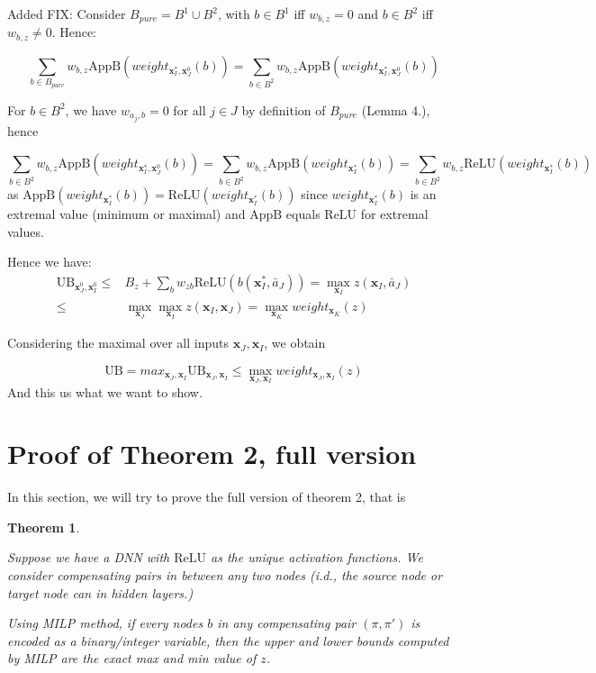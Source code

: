 \documentclass[]{article}
\newtheorem{theorem}{Theorem}
\theoremstyle{definition}
\newcommand{\ReLU}{\mathrm{ReLU}}
\begin{document}
Added FIX:
Consider $B_{pure}=B^1 \cup B^2$, with $b \in B^1$ iff
$w_{b,z} = 0$ and $b \in B^2$ iff $w_{b,z} \neq 0$.
Hence:

$$\sum_{b\in B_{pure}} w_{b,z} \mathrm{AppB}(weight_{\boldsymbol{x}^*_I,\boldsymbol{x}^0_J}(b)) = 
\sum_{b\in B^2} w_{b,z} \mathrm{AppB}(weight_{\boldsymbol{x}^*_I,\boldsymbol{x}^0_J}(b))$$

For $b \in B^2$, we have $w_{a_j,b}=0$ for all $j \in J$
by definition of $B_{pure}$ (Lemma 4.), hence

$$\sum_{b\in B^2} w_{b,z} \mathrm{AppB}(weight_{\boldsymbol{x}^*_I,\boldsymbol{x}^0_J}(b)) = 
\sum_{b\in B^2} w_{b,z} \mathrm{AppB}(weight_{\boldsymbol{x}^*_I}(b))
=\sum_{b\in B^2} w_{b,z} \mathrm{ReLU}(weight_{\boldsymbol{x}^*_I}(b))
$$ as $\mathrm{AppB}(weight_{\boldsymbol{x}^*_I}(b))=\mathrm{ReLU}(weight_{\boldsymbol{x}^*_I}(b))$ since 
$weight_{\boldsymbol{x}^*_I}(b)$ is an extremal value (minimum or maximal) and 
$\mathrm{AppB}$ equals $\mathrm{ReLU}$ for extremal values.

Hence we have: \begin{align*}
	\mathrm{UB}_{\boldsymbol{x}^0_J,\boldsymbol{x}^0_I}  \leq & B_z+\sum_{b}w_{zb}\ReLU(b(\boldsymbol{x}_I^*,\bar{a}_J))
	= \max_{\boldsymbol{x}_I} z(\boldsymbol{x}_I,\bar{a}_J) \\
	\leq & \max_{\boldsymbol{x}_J}\max_{\boldsymbol{x}_I} z(\boldsymbol{x}_I,\boldsymbol{x}_J) 	= \max_{\boldsymbol{x}_K} weight_{\boldsymbol{x}_K}(z)
\end{align*}

Considering the maximal over all inputs $\boldsymbol{x}_J,\boldsymbol{x}_I$, we obtain 

$$\mathrm{UB} = max_{\boldsymbol{x}_J,\boldsymbol{x}_I} \mathrm{UB}_{\boldsymbol{x}_J,\boldsymbol{x}_I} \leq \max_{\boldsymbol{x}_J,\boldsymbol{x}_I} weight_{\boldsymbol{x}_J,\boldsymbol{x}_I}(z)$$ And this us what we want to show.


\section{Proof of Theorem 2, full version}

In this section, we will try to prove the full version of theorem 2, that is 

\begin{theorem}
	\label{no_diamond_3}
	
	Suppose we have a DNN with $\ReLU$ as the unique activation functions. We consider compensating pairs in between any two nodes (i.d., the source node or target node can in hidden layers.)
	
	Using MILP method, if every nodes $b$ in any compensating pair
	$(\pi,\pi')$ is encoded as a binary/integer variable, then the upper and lower 
	bounds computed by MILP are the exact max and min value of $z$.
\end{theorem}
\end{document}
